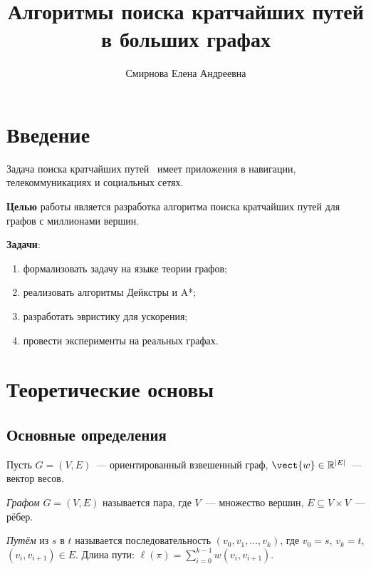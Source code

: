 \documentclass[font=modern]{cmcmsuthesis-master}
\author{Смирнова Елена Андреевна}
\title{Алгоритмы поиска кратчайших путей в больших графах}
\begin{document}
\maketitle
\tableofcontents

\section*{Введение}

Задача поиска кратчайших путей~\cite{shannon1948} имеет
приложения в навигации, телекоммуникациях и социальных сетях.

\textbf{Целью} работы является разработка алгоритма поиска
кратчайших путей для графов с миллионами вершин.

\textbf{Задачи}:
\begin{enumerate}[beginpenalty=10000]
    \item формализовать задачу на языке теории графов;
    \item реализовать алгоритмы Дейкстры и A*;
    \item разработать эвристику для ускорения;
    \item провести эксперименты на реальных графах.
\end{enumerate}

\section{Теоретические основы}\label{sec:theory}

\subsection{Основные определения}

Пусть $G=(V,E)$~--- ориентированный взвешенный граф,
$\vect{w}\in\mathbb{R}^{|E|}$~--- вектор весов.

\begin{definition}\label{def:graph}
\emph{Графом} $G=(V,E)$ называется пара, где $V$~---
множество вершин, $E\subseteq V\times V$~--- рёбер.
\end{definition}

\begin{definition}\label{def:path}
\emph{Путём} из $s$ в $t$ называется последовательность
$(v_0,v_1,\ldots,v_k)$, где $v_0=s$, $v_k=t$,
$(v_i,v_{i+1})\in E$. Длина пути:
$\ell(\pi)=\sum_{i=0}^{k-1}w(v_i,v_{i+1})$.
\end{definition}
\end{document}
